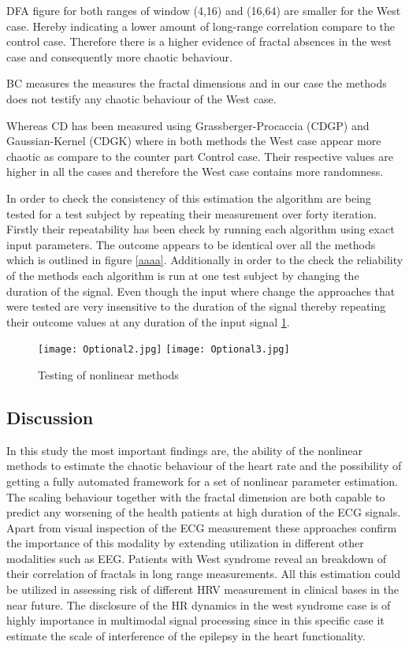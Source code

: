 DFA figure for both ranges of window (4,16) and (16,64) are smaller for the West case. Hereby indicating a lower amount of long-range correlation compare to the control case. Therefore there is a higher evidence of fractal absences in the west case and consequently more chaotic behaviour. 

BC measures the measures the fractal dimensions and in our case the methods does not testify any chaotic behaviour of the West case.  


Whereas CD has been measured using Grassberger-Procaccia (CDGP) and Gaussian-Kernel (CDGK) where in both methods the West case appear more chaotic as compare to the counter part Control case. Their respective values are higher in all the cases and therefore the West case contains more randomness. 


In order to check the consistency of this estimation the algorithm are being tested for a test subject by repeating their measurement over forty iteration. 
Firstly their repeatability has been check by running each algorithm using exact input parameters. The outcome appears to be identical over all the methods which is outlined in figure \ref{aaaa}. Additionally in order to the check the reliability of the methods each algorithm is run at one test subject by changing the duration of the signal. Even though the input where change the approaches that were tested are very insensitive to the duration of the signal thereby repeating their outcome values at any duration of the input signal \ref{bbbb}. 


\begin{figure}[!htbp]
%
\centering
\texttt{[image: Optional2.jpg]}
\label{aaaa}
\endminipage\hfill
{}%
\centering
\texttt{[image: Optional3.jpg]}
\label{bbbb}
\endminipage\hfill
\caption{Testing of nonlinear methods}
\end{figure}

\subsection{Discussion}

In this study the most important findings are, the ability of the nonlinear methods to estimate the chaotic behaviour of the heart rate and the possibility of getting a fully automated framework for a set of nonlinear parameter estimation. The scaling behaviour together with the fractal dimension are both capable to predict any worsening of the health patients at high duration of the ECG signals. Apart from visual inspection of the ECG measurement these approaches confirm the importance of this modality by extending utilization in different other modalities such as EEG. Patients with West syndrome reveal an breakdown of their correlation of fractals in long range measurements. All this estimation could be utilized in assessing risk of different HRV measurement in clinical bases in the near future. The disclosure of the HR dynamics in the west syndrome case is of highly importance in multimodal signal processing since in this specific case it estimate the scale of interference of the epilepsy in the heart functionality.